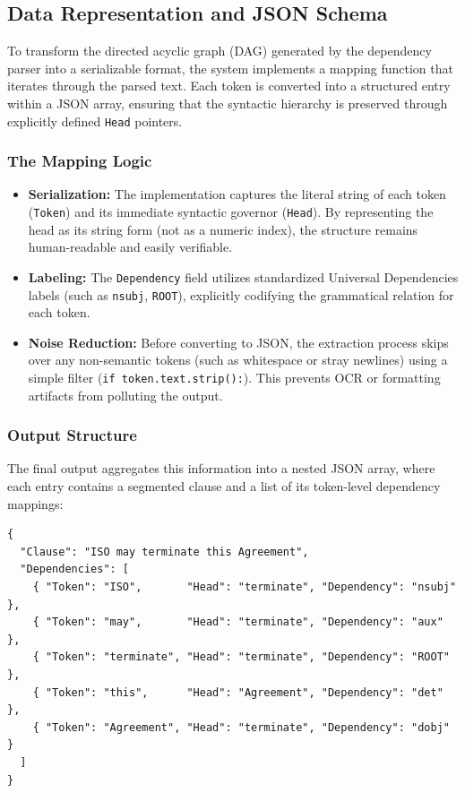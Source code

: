 \documentclass[twoside,final]{hcmut-report}
\begin{document}
\subsection{Data Representation and JSON Schema}
To transform the directed acyclic graph (DAG) generated by the dependency parser into a serializable format, the system implements a mapping function that iterates through the parsed text. Each token is converted into a structured entry within a JSON array, ensuring that the syntactic hierarchy is preserved through explicitly defined \texttt{Head} pointers.

\subsubsection*{The Mapping Logic}
\begin{itemize}[topsep=0pt, parsep=0pt, itemsep=0pt]
  \item \textbf{Serialization:} The implementation captures the literal string of each token (\texttt{Token}) and its immediate syntactic governor (\texttt{Head}). By representing the head as its string form (not as a numeric index), the structure remains human-readable and easily verifiable.
  \item \textbf{Labeling:} The \texttt{Dependency} field utilizes standardized Universal Dependencies labels (such as \texttt{nsubj}, \texttt{ROOT}), explicitly codifying the grammatical relation for each token.
  \item \textbf{Noise Reduction:} Before converting to JSON, the extraction process skips over any non-semantic tokens (such as whitespace or stray newlines) using a simple filter (\texttt{if token.text.strip():}). This prevents OCR or formatting artifacts from polluting the output.
\end{itemize}

\subsubsection*{Output Structure}
The final output aggregates this information into a nested JSON array, where each entry contains a segmented clause and a list of its token-level dependency mappings:\clearpage
\begin{verbatim}
{
  "Clause": "ISO may terminate this Agreement",
  "Dependencies": [
    { "Token": "ISO",       "Head": "terminate", "Dependency": "nsubj" },
    { "Token": "may",       "Head": "terminate", "Dependency": "aux"   },
    { "Token": "terminate", "Head": "terminate", "Dependency": "ROOT"  },
    { "Token": "this",      "Head": "Agreement", "Dependency": "det"   },
    { "Token": "Agreement", "Head": "terminate", "Dependency": "dobj"  }
  ]
}
\end{verbatim}
\end{document}
